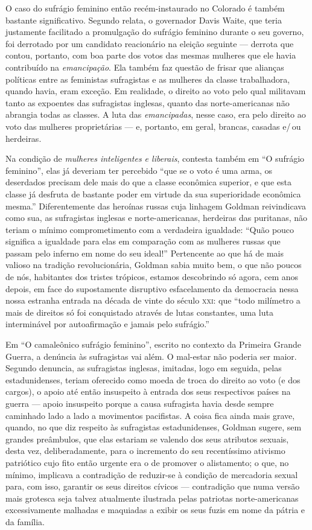 O caso do sufrágio feminino então recém-instaurado
no Colorado é também bastante significativo. Segundo relata, o
governador Davis Waite, que teria justamente facilitado a promulgação do
sufrágio feminino durante o seu governo, foi derrotado por um candidato
reacionário na eleição seguinte --- derrota que contou, portanto, com boa
parte dos votos das mesmas mulheres que ele havia contribuído na
\textit{emancipação}. Ela também faz questão de frisar que alianças políticas
entre as feministas sufragistas e as mulheres da classe trabalhadora,
quando havia, eram exceção. Em realidade, o direito ao voto pelo qual
militavam tanto as expoentes das sufragistas inglesas, quanto das
norte-americanas não abrangia todas as classes. A luta das
\textit{emancipadas}, nesse caso, era pelo direito ao voto das mulheres
proprietárias --- e, portanto, em geral, brancas, casadas e/\,ou herdeiras.

Na condição de \textit{mulheres inteligentes e liberais}, contesta também em
``O sufrágio feminino'', elas já deveriam ter percebido ``que se o voto
é uma arma, os deserdados precisam dele mais do que a classe econômica
superior, e que esta classe já desfruta de bastante poder em virtude da
sua superioridade econômica mesma.'' Diferentemente das heroínas russas
cuja linhagem Goldman reivindicava como sua, as sufragistas inglesas e
norte-americanas, herdeiras das puritanas, não teriam o mínimo
comprometimento com a verdadeira igualdade: ``Quão pouco significa a
igualdade para elas em comparação com as mulheres russas que passam pelo
inferno em nome do seu ideal!'' Pertencente ao que há de mais valioso na
tradição revolucionária, Goldman sabia muito bem, o que não poucos de
nós, habitantes dos tristes trópicos, estamos descobrindo só agora, cem
anos depois, em face do supostamente disruptivo esfacelamento da
democracia nessa nossa estranha entrada na década de vinte do século
\textsc{xxi}: que ``todo milímetro a mais de direitos só foi conquistado através
de lutas constantes, uma luta interminável por autoafirmação e jamais
pelo sufrágio.''

Em ``O camaleônico sufrágio feminino'', escrito no contexto da Primeira
Grande Guerra, a denúncia às sufragistas vai além. O mal-estar não
poderia ser maior. Segundo denuncia, as sufragistas inglesas, imitadas,
logo em seguida, pelas estadunidenses, teriam oferecido como moeda de
troca do direito ao voto (e dos cargos), o apoio até então insuspeito à
entrada dos seus respectivos países na guerra --- apoio insuspeito porque
a causa sufragista havia desde sempre caminhado lado a lado a movimentos
pacifistas. A coisa fica ainda mais grave, quando, no que diz respeito
às sufragistas estadunidenses, Goldman sugere, sem grandes preâmbulos,
que elas estariam se valendo dos seus atributos sexuais, desta vez,
deliberadamente, para o incremento do seu recentíssimo ativismo
patriótico cujo fito então urgente era o de promover o alistamento; o
que, no mínimo, implicava a contradição de reduzir-se à condição de
mercadoria sexual para, com isso, garantir os seus direitos cívicos ---
contradição que numa versão mais grotesca seja talvez atualmente
ilustrada pelas patriotas norte-americanas excessivamente malhadas e
maquiadas a exibir os seus fuzis em nome da pátria e da família. 

